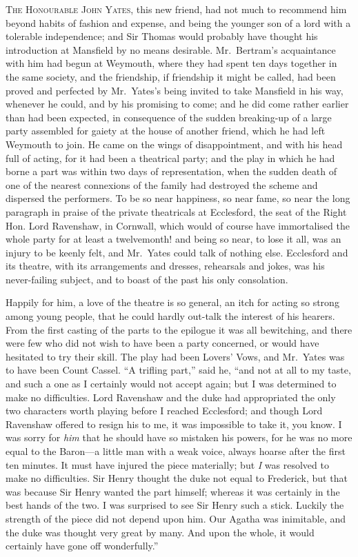 \documentclass{article}
\newcommand{\gintro}[1]{\textcolor{gcolor}{\textsc{#1}}}
\begin{document}
\gintro{The Honourable John Yates,} this new friend, had not much
to recommend him beyond habits of fashion and expense,
and being the younger son of a lord with a tolerable
independence; and Sir Thomas would probably have thought
his introduction at Mansfield by no means desirable.
Mr.\ Bertram's acquaintance with him had begun at Weymouth,
where they had spent ten days together in the same society,
and the friendship, if friendship it might be called,
had been proved and perfected by Mr.\ Yates's being invited
to take Mansfield in his way, whenever he could, and by his
promising to come; and he did come rather earlier than had
been expected, in consequence of the sudden breaking-up
of a large party assembled for gaiety at the house
of another friend, which he had left Weymouth to join.
He came on the wings of disappointment, and with his head
full of acting, for it had been a theatrical party;
and the play in which he had borne a part was within
two days of representation, when the sudden death
of one of the nearest connexions of the family had
destroyed the scheme and dispersed the performers.
To be so near happiness, so near fame, so near the long
paragraph in praise of the private theatricals at Ecclesford,
the seat of the Right Hon. Lord Ravenshaw, in Cornwall,
which would of course have immortalised the whole party
for at least a twelvemonth! and being so near, to lose
it all, was an injury to be keenly felt, and Mr.\ Yates
could talk of nothing else.  Ecclesford and its theatre,
with its arrangements and dresses, rehearsals and jokes,
was his never-failing subject, and to boast of the past his
only consolation.

Happily for him, a love of the theatre is so general,
an itch for acting so strong among young people, that he
could hardly out-talk the interest of his hearers.
From the first casting of the parts to the epilogue
it was all bewitching, and there were few who did
not wish to have been a party concerned, or would have
hesitated to try their skill.  The play had been Lovers'
Vows, and Mr.\ Yates was to have been Count Cassel.
``A trifling part,'' said he, ``and not at all to my taste,
and such a one as I certainly would not accept again;
but I was determined to make no difficulties.
Lord Ravenshaw and the duke had appropriated the only two
characters worth playing before I reached Ecclesford;
and though Lord Ravenshaw offered to resign his to me,
it was impossible to take it, you know.  I was sorry
for \emph{him} that he should have so mistaken his powers,
for he was no more equal to the Baron---a little man
with a weak voice, always hoarse after the first
ten minutes.  It must have injured the piece materially;
but \emph{I} was resolved to make no difficulties.
Sir Henry thought the duke not equal to Frederick,
but that was because Sir Henry wanted the part himself;
whereas it was certainly in the best hands of the two.
I was surprised to see Sir Henry such a stick.
Luckily the strength of the piece did not depend upon him.
Our Agatha was inimitable, and the duke was thought very great
by many.  And upon the whole, it would certainly have gone
off wonderfully.''
\end{document}
